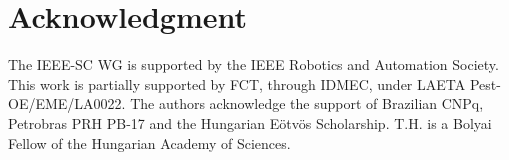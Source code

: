 \documentclass[preprint,12pt]{elsarticle}
\begin{document}


\section*{Acknowledgment}

The IEEE-SC WG is supported by the IEEE Robotics and Automation Society.
This work is partially supported by FCT, through IDMEC, under LAETA Pest-OE/EME/LA0022. The authors acknowledge the support of Brazilian CNPq, Petrobras PRH PB-17 and the Hungarian E\"{o}tv\"os Scholarship. T.H. is a Bolyai Fellow of the Hungarian Academy of Sciences. 




%
%
\end{document}
